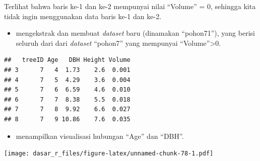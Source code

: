 \documentclass[
  12pt,
  a4paper,
]{scrbook}
\newenvironment{Shaded}{\begin{snugshade}}{\end{snugshade}}
\newcommand{\CommentTok}[1]{\textcolor[rgb]{0.56,0.35,0.01}{\textit{#1}}}
\newcommand{\DataTypeTok}[1]{\textcolor[rgb]{0.13,0.29,0.53}{#1}}
\newcommand{\DecValTok}[1]{\textcolor[rgb]{0.00,0.00,0.81}{#1}}
\newcommand{\FloatTok}[1]{\textcolor[rgb]{0.00,0.00,0.81}{#1}}
\newcommand{\KeywordTok}[1]{\textcolor[rgb]{0.13,0.29,0.53}{\textbf{#1}}}
\newcommand{\NormalTok}[1]{#1}
\newcommand{\OperatorTok}[1]{\textcolor[rgb]{0.81,0.36,0.00}{\textbf{#1}}}
\newcommand{\StringTok}[1]{\textcolor[rgb]{0.31,0.60,0.02}{#1}}
\providecommand{\tightlist}{%
  \setlength{\itemsep}{0pt}\setlength{\parskip}{0pt}}
\begin{document}
Terlihat bahwa baris ke-1 dan ke-2 mempunyai nilai ``Volume'' = 0,
sehingga kita tidak ingin menggunakan data baris ke-1 dan ke-2.

\begin{itemize}
\tightlist
\item
  mengekstrak dan membuat \emph{dataset} baru (dinamakan ``pohon71''),
  yang berisi seluruh dari dari \emph{dataset} ``pohon7'' yang mempunyai
  ``Volume''\textgreater0.
\end{itemize}

\begin{Shaded}
\end{Shaded}

\begin{verbatim}
##   treeID Age   DBH Height Volume
## 3      7   4  1.73    2.6  0.001
## 4      7   5  4.29    3.6  0.004
## 5      7   6  6.59    4.6  0.010
## 6      7   7  8.38    5.5  0.018
## 7      7   8  9.92    6.6  0.027
## 8      7   9 10.86    7.6  0.035
\end{verbatim}

\begin{itemize}
\tightlist
\item
  menampilkan visualisasi hubungan ``Age'' dan ``DBH''.
\end{itemize}

\begin{Shaded}
\end{Shaded}

\texttt{[image: dasar\_r\_files/figure-latex/unnamed-chunk-78-1.pdf]}
\end{document}
